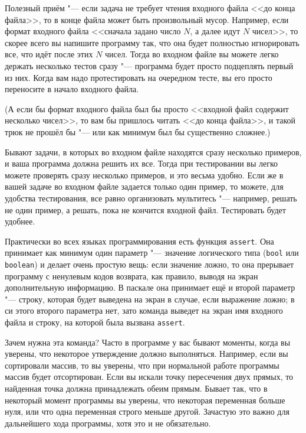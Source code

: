 \documentclass[a4paper,10pt]{problems}
\begin{document}
Полезный приём "--- если задача не требует чтения входного файла <<до конца файла>>, то в конце файла может быть произвольный мусор. 
Например, если формат входного файла <<сначала задано число $N$, а далее идут $N$ чисел>>, то скорее всего вы напишите программу так, 
что она будет полностью игнорировать все, что идёт после этих $N$ чисел. 
Тогда во входном файле вы можете легко держать несколько тестов сразу "--- программа будет просто подцеплять первый из них. 
Когда вам надо протестировать на очередном тесте, вы его просто переносите в начало входного файла.

(А если бы формат входного файла был бы просто <<входной файл содержит несколько чисел>>, то вам бы пришлось читать <<до конца файла>>, и такой трюк не прошёл бы
"--- или как минимум был бы существенно сложнее.)

Бывают задачи, в которых во входном файле находятся сразу несколько примеров, и ваша программа должна решить их все. 
Тогда при тестировании вы легко можете проверять сразу несколько примеров, и это весьма удобно. 
Если же в вашей задаче во входном файле задается только один пример, то можете, для удобства тестирования, 
все равно организовать мультитесь "--- например, решать не один пример, а решать, пока не кончится входной файл.
Тестировать будет удобнее.

Практически во всех языках программирования есть функция \verb`assert`. 
Она принимает как минимум один параметр "--- значение логического типа (\verb`bool` или \verb`boolean`) и делает очень простую вещь:
если значение ложно, то она прерывает программу с ненулевым кодов возврата, как правило, выводя на экран дополнительную информацию.
В паскале она принимает ещё и второй параметр "--- строку, которая будет выведена на экран в случае, если выражение ложно; в си этого второго параметра нет,
зато команда выведет на экран имя входного файла и строку, на которой была вызвана \verb`assert`.

Зачем нужна эта команда? 
Часто в программе у вас бывают моменты, когда вы уверены, что некоторое утверждение должно выполняться.
Например, если вы сортировали массив, то вы уверены, что при нормальной работе программы массив будет отсортирован.
Если вы искали точку пересечения двух прямых, то найденная точка должна принадлежать обеим прямым. 
Бывает так, что в некоторый момент программы вы уверены, что некоторая переменная больше нуля, или
что одна переменная строго меньше другой. Зачастую это важно для дальнейшего хода программы, хотя это и не обязательно.
\end{document}
